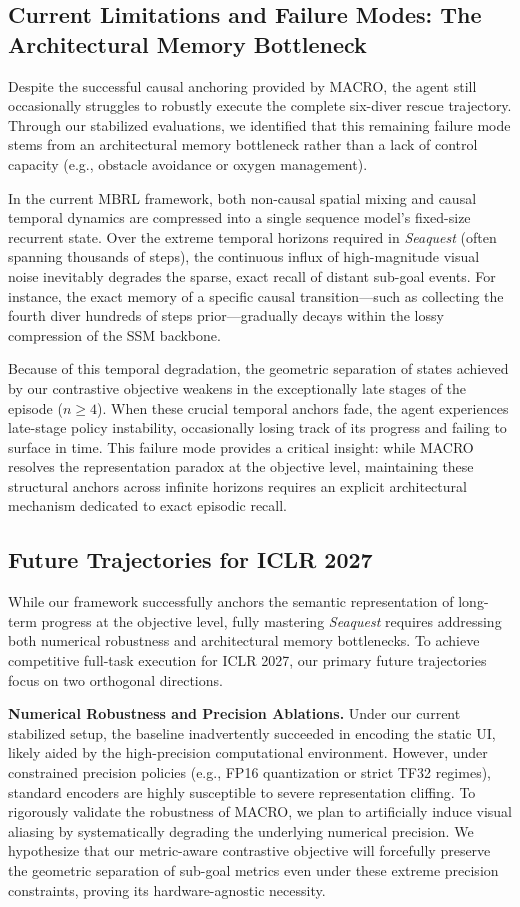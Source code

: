\documentclass{article} %
\begin{document}
\subsection{Current Limitations and Failure Modes: The Architectural Memory Bottleneck}
Despite the successful causal anchoring provided by MACRO, the agent still occasionally struggles to robustly execute the complete six-diver rescue trajectory. Through our stabilized evaluations, we identified that this remaining failure mode stems from an architectural memory bottleneck rather than a lack of control capacity (e.g., obstacle avoidance or oxygen management).

In the current MBRL framework, both non-causal spatial mixing and causal temporal dynamics are compressed into a single sequence model's fixed-size recurrent state. Over the extreme temporal horizons required in \textit{Seaquest} (often spanning thousands of steps), the continuous influx of high-magnitude visual noise inevitably degrades the sparse, exact recall of distant sub-goal events. For instance, the exact memory of a specific causal transition—such as collecting the fourth diver hundreds of steps prior—gradually decays within the lossy compression of the SSM backbone.

Because of this temporal degradation, the geometric separation of states achieved by our contrastive objective weakens in the exceptionally late stages of the episode ($n \ge 4$). When these crucial temporal anchors fade, the agent experiences late-stage policy instability, occasionally losing track of its progress and failing to surface in time. This failure mode provides a critical insight: while MACRO resolves the representation paradox at the objective level, maintaining these structural anchors across infinite horizons requires an explicit architectural mechanism dedicated to exact episodic recall.

\subsection{Future Trajectories for ICLR 2027}
While our framework successfully anchors the semantic representation of long-term progress at the objective level, fully mastering \textit{Seaquest} requires addressing both numerical robustness and architectural memory bottlenecks. To achieve competitive full-task execution for ICLR 2027, our primary future trajectories focus on two orthogonal directions.

\textbf{Numerical Robustness and Precision Ablations.}
Under our current stabilized setup, the baseline inadvertently succeeded in encoding the static UI, likely aided by the high-precision computational environment. However, under constrained precision policies (e.g., FP16 quantization or strict TF32 regimes), standard encoders are highly susceptible to severe representation cliffing. To rigorously validate the robustness of MACRO, we plan to artificially induce visual aliasing by systematically degrading the underlying numerical precision. We hypothesize that our metric-aware contrastive objective will forcefully preserve the geometric separation of sub-goal metrics even under these extreme precision constraints, proving its hardware-agnostic necessity.
\end{document}
